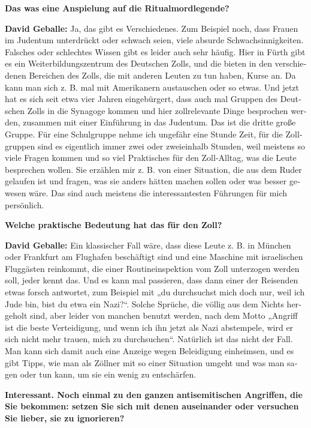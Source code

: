\begin{otherlanguage}{ngerman}
\textbf{Das was eine Anspielung auf die Ritualmordlegende?} 

\textbf{David Geballe:} Ja, das gibt es Verschiedenes. Zum Beispiel noch, dass Frauen im Judentum unterdrückt oder schwach seien, viele absurde Schwachsinnigkeiten. Falsches oder schlechtes Wissen gibt es leider auch sehr häufig. Hier in Fürth gibt es ein Weiterbildungszentrum des Deutschen Zolls, und die bieten in den verschiedenen Bereichen des Zolls, die mit anderen Leuten zu tun haben, Kurse an. Da kann man sich z. B. mal mit Amerikanern austauschen oder so etwas. Und jetzt hat es sich seit etwa vier Jahren eingebürgert, dass auch mal Gruppen des Deutschen Zolls in die Synagoge kommen und hier zollrelevante Dinge besprochen werden, zusammen mit einer Einführung in das Judentum. Das ist die dritte große Gruppe. Für eine Schulgruppe nehme ich ungefähr eine Stunde Zeit, für die Zollgruppen sind es eigentlich immer zwei oder zweieinhalb Stunden, weil meistens so viele Fragen kommen und so viel Praktisches für den Zoll-Alltag, was die Leute besprechen wollen. Sie erzählen mir z. B. von einer Situation, die aus dem Ruder gelaufen ist und fragen, was sie anders hätten machen sollen oder was besser gewesen wäre. Das sind auch meistens die interessantesten Führungen für mich persönlich. 

\textbf{Welche praktische Bedeutung hat das für den Zoll?}

\textbf{David Geballe:} Ein klassischer Fall wäre, dass diese Leute z. B. in München oder Frankfurt am Flughafen beschäftigt sind und eine Maschine mit israelischen Fluggästen reinkommt, die einer Routineinspektion vom Zoll unterzogen werden soll, jeder kennt das. Und es kann mal passieren, dass dann einer der Reisenden etwas forsch antwortet, zum Beispiel mit „du durchsuchst mich doch nur, weil ich Jude bin, bist du etwa ein Nazi?“. Solche Sprüche, die völlig aus dem Nichts hergeholt sind, aber leider von manchen benutzt werden, nach dem Motto „Angriff ist die beste Verteidigung, und wenn ich ihn jetzt als Nazi abstempele, wird er sich nicht mehr trauen, mich zu durchsuchen“. Natürlich ist das nicht der Fall. Man kann sich damit auch eine Anzeige wegen Beleidigung einheimsen, und es gibt Tipps, wie man als Zöllner mit so einer Situation umgeht und was man sagen oder tun kann, um sie ein wenig zu entschärfen. 

\textbf{Interessant. Noch einmal zu den ganzen antisemitischen Angriffen, die Sie bekommen: setzen Sie sich mit denen auseinander oder versuchen Sie lieber, sie zu ignorieren?} 


\end{otherlanguage}
